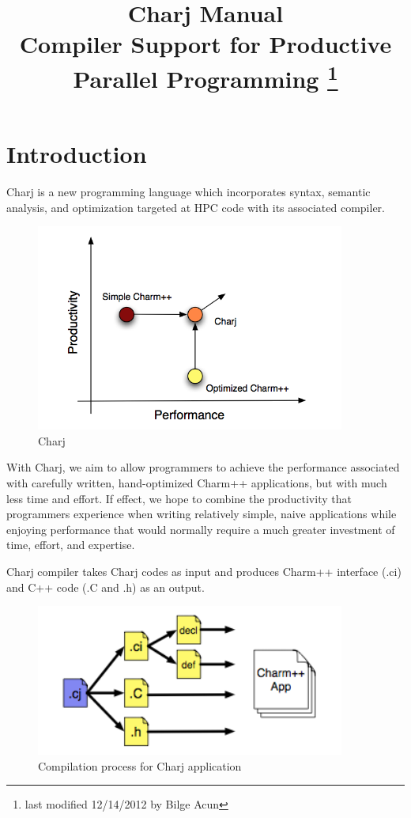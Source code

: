 \documentclass[11pt]{article}
\title{Charj Manual \\ Compiler Support for Productive Parallel Programming \footnote{last modified 12/14/2012 by Bilge Acun}}
\begin{document}
\maketitle

\section{Introduction}

Charj is a new programming language which incorporates syntax, semantic analysis, and optimization targeted at HPC code with its associated compiler. 

\begin{figure}[h]
\begin{center}
\includegraphics[width=4in]{fig/fig0.png}
\end{center}
\caption{Charj}
\label{fig:fig0}
\end{figure}

With Charj, we aim to allow programmers to achieve the performance associated with carefully written, hand-optimized Charm++ applications, but with much less time and effort. If effect, we hope to combine the productivity that programmers experience when writing relatively simple, naive applications while enjoying performance that would normally require a much greater investment of time, effort, and expertise. 

Charj compiler takes Charj codes as input and produces Charm++ interface (.ci) and C++ code (.C and .h) as an output. 

\begin{figure}[h]
\begin{center}
\includegraphics[width=4in]{fig/fig1.png}
\end{center}
\caption{Compilation process for Charj application}
\label{fig:fig1}
\end{figure}
\end{document}
